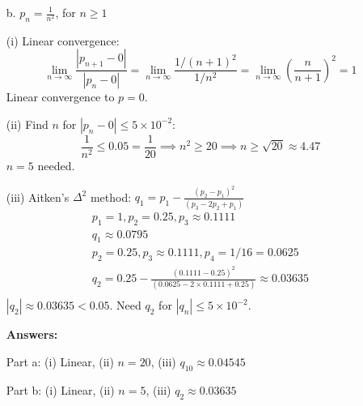 \begin{enumerate}
\begin{enumerate}
      \item[b.] \( p_n = \frac{1}{n^2} \), for \( n \ge 1 \)

        (i) Linear convergence:
        \[
          \lim_{n \to \infty} \frac{|p_{n+1} - 0|}{|p_n - 0|} =
          \lim_{n \to \infty} \frac{1/(n+1)^2}{1/n^2} = \lim_{n \to
          \infty} \left(\frac{n}{n+1}\right)^2 = 1
        \]
        Linear convergence to \( p=0 \).

        (ii) Find \( n \) for \( |p_n - 0| \le 5 \times 10^{-2} \):
        \[
          \frac{1}{n^2} \le 0.05 = \frac{1}{20} \implies n^2 \ge 20
          \implies n \ge \sqrt{20} \approx 4.47
        \]
        \( n = 5 \) needed.

        (iii) Aitken's \( \Delta^2 \) method: \( q_1 = p_1 -
        \frac{(p_2 - p_1)^2}{(p_3 - 2p_2 + p_1)} \)
        \[
          \begin{array}{l}
            p_1 = 1, p_2 = 0.25, p_3 \approx 0.1111 \\
            q_1 \approx 0.0795 \\
            p_2 = 0.25, p_3 \approx 0.1111, p_4 = 1/16 = 0.0625 \\
            q_2 = 0.25 - \frac{(0.1111 - 0.25)^2}{(0.0625 - 2 \times
            0.1111 + 0.25)} \approx 0.03635 \\
          \end{array}
        \]
        \( |q_2| \approx 0.03635 < 0.05 \). Need \( q_2 \) for \(
        |q_n| \le 5 \times 10^{-2} \).

        \textbf{Answers:}

        Part a: (i) Linear, (ii) \( n = 20 \), (iii) \( q_{10}
        \approx 0.04545 \)

        Part b: (i) Linear, (ii) \( n = 5 \), (iii) \( q_2 \approx 0.03635 \)

    \end{enumerate}
\end{enumerate}
